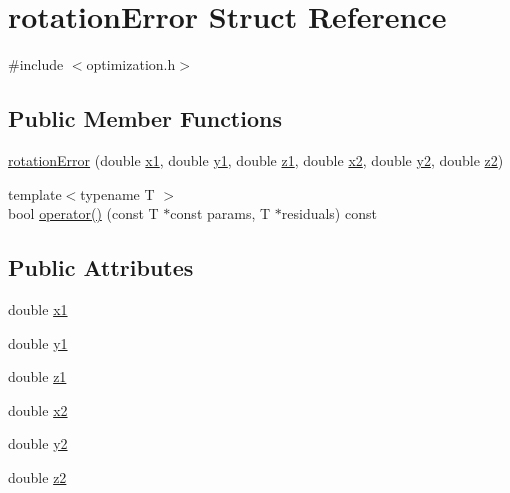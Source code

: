 \hypertarget{structrotationError}{\section{rotation\-Error Struct Reference}
\label{dd/d4e/structrotationError}
}


{\ttfamily \#include $<$optimization.\-h$>$}

\subsection*{Public Member Functions}
\begin{DoxyCompactItemize}
\item 
\hyperlink{structrotationError_aae8d21c715df1ad4f3a004eed8ba17a4}{rotation\-Error} (double \hyperlink{structrotationError_a9415ed45ed91f063e52f29ce11b61273}{x1}, double \hyperlink{structrotationError_af3636f2f2ee2e540f190eaabe268358a}{y1}, double \hyperlink{structrotationError_aef6f024e5632102285d2214ebf86a5d7}{z1}, double \hyperlink{structrotationError_ac15987a3eeed2caea868782d96446b41}{x2}, double \hyperlink{structrotationError_aef6cabe438fbe705ae5d26c96caf73f4}{y2}, double \hyperlink{structrotationError_af6db1bdce5eb86f310b3d3be803c7e40}{z2})
\item 
{\footnotesize template$<$typename T $>$ }\\bool \hyperlink{structrotationError_a14f84854efd623a56c9681ee18f95fe0}{operator()} (const T $\ast$const params, T $\ast$residuals) const 
\end{DoxyCompactItemize}
\subsection*{Public Attributes}
\begin{DoxyCompactItemize}
\item 
double \hyperlink{structrotationError_a9415ed45ed91f063e52f29ce11b61273}{x1}
\item 
double \hyperlink{structrotationError_af3636f2f2ee2e540f190eaabe268358a}{y1}
\item 
double \hyperlink{structrotationError_aef6f024e5632102285d2214ebf86a5d7}{z1}
\item 
double \hyperlink{structrotationError_ac15987a3eeed2caea868782d96446b41}{x2}
\item 
double \hyperlink{structrotationError_aef6cabe438fbe705ae5d26c96caf73f4}{y2}
\item 
double \hyperlink{structrotationError_af6db1bdce5eb86f310b3d3be803c7e40}{z2}
\end{DoxyCompactItemize}


